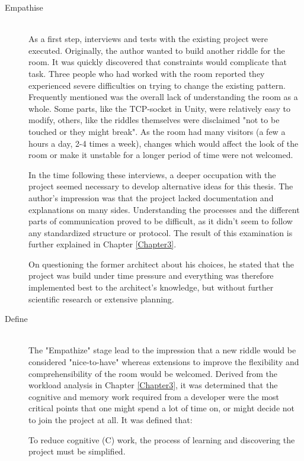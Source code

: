 \begin{description}
	\item [Empathise]\hfill \\
	      As a first step, interviews and tests with the existing project were executed.
	      Originally, the author wanted to build another riddle for the room.
	      It was quickly discovered that constraints would complicate that task.
	      Three people who had worked with the room reported they experienced severe difficulties
	      on trying to change the existing pattern.
	      Frequently mentioned was the overall lack of understanding the room as a whole.
	      Some parts, like the TCP-socket in Unity, were relatively easy to modify, others, like the riddles themselves were disclaimed
	      "not to be touched or they might break".
	      As the room had many visitors (a few a hours a day, 2-4 times a week), changes which would affect the look
	      of the room or make it unstable for a longer period of time were not welcomed.

	      In the time following these interviews,
	      a deeper occupation with the project seemed necessary to develop alternative ideas for this thesis.
	      The author's impression was that the project lacked documentation and explanations on many sides.
	      Understanding the processes and the different parts of communication proved to be difficult,
	      as it didn't seem to follow any standardized structure or protocol.
	      The result of this examination is further explained in Chapter \ref{Chapter3}.

	      On questioning the former architect about his choices,
	      he stated that the project was build under time pressure
	      and everything was therefore implemented best to the architect's knowledge,
	      but without further scientific research or extensive planning.

	\item [Define]\hfill \\
	      The "Empathize" stage lead to the impression that a new riddle
	      would be considered "nice-to-have" whereas
		  extensions to improve the flexibility and comprehensibility of the room would be welcomed.
		  Derived from the workload analysis in Chapter \ref{Chapter3},	 
	it was determined that the cognitive and memory work required from a developer were the most critical points
	that one might spend a lot of time on, or might decide not to join the project at all.
	It was defined that:

	To reduce cognitive (C) work, the process of learning and discovering the project must be simplified.


\end{description}
